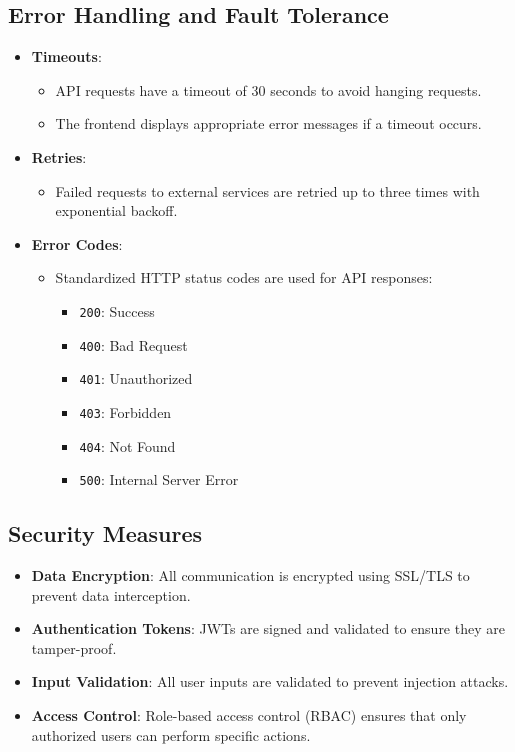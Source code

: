 \documentclass[12pt, titlepage]{article}
\begin{document}
\subsection*{Error Handling and Fault Tolerance}
\begin{itemize}
  \item \textbf{Timeouts}:
        \begin{itemize}
          \item API requests have a timeout of 30 seconds to avoid hanging requests.
          \item The frontend displays appropriate error messages if a timeout occurs.
        \end{itemize}
  \item \textbf{Retries}:
        \begin{itemize}
          \item Failed requests to external services are retried up to three times with exponential backoff.
        \end{itemize}
  \item \textbf{Error Codes}:
        \begin{itemize}
          \item Standardized HTTP status codes are used for API responses:
                \begin{itemize}
                  \item \texttt{200}: Success
                  \item \texttt{400}: Bad Request
                  \item \texttt{401}: Unauthorized
                  \item \texttt{403}: Forbidden
                  \item \texttt{404}: Not Found
                  \item \texttt{500}: Internal Server Error
                \end{itemize}
        \end{itemize}
\end{itemize}

\subsection*{Security Measures}
\begin{itemize}
  \item \textbf{Data Encryption}: All communication is encrypted using SSL/TLS to prevent data interception.
  \item \textbf{Authentication Tokens}: JWTs are signed and validated to ensure they are tamper-proof.
  \item \textbf{Input Validation}: All user inputs are validated to prevent injection attacks.
  \item \textbf{Access Control}: Role-based access control (RBAC) ensures that only authorized users can perform specific actions.
\end{itemize}
\end{document}
